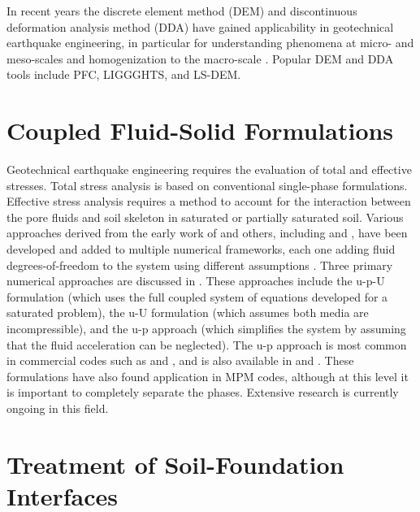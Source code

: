 In recent years the discrete element method (DEM) and discontinuous deformation analysis method (DDA) have gained applicability in geotechnical earthquake engineering, in particular for understanding phenomena at micro- and meso-scales and homogenization to the macro-scale \citep{kawamoto2018}. Popular DEM and DDA tools include PFC, LIGGGHTS, and LS-DEM.   

\section{Coupled Fluid-Solid Formulations}
\label{sec:resp_geotech_2}

Geotechnical earthquake engineering requires the evaluation of total and effective stresses. Total stress analysis is based on conventional single-phase formulations. Effective stress analysis requires a method to account for the interaction between the pore fluids and soil skeleton in saturated or partially saturated soil. Various approaches derived from the early work of \cite{Biot41, Biot56, Biot62} and others, including \cite{Borja06} and \cite{Ehlers02}, have been developed and added to multiple numerical frameworks, each one adding fluid degrees-of-freedom to the system using different assumptions \citep{Arduino01}. Three primary numerical approaches are discussed in \cite{Zienk84}. These approaches include the u-p-U formulation (which uses the full coupled system of equations developed for a saturated problem), the u-U formulation (which assumes both media are incompressible), and the u-p approach (which simplifies the system by assuming that the fluid acceleration can be neglected). The u-p approach is most common in commercial codes such as  and , and is also available in  and . These formulations have also found application in MPM codes, although at this level it is important to completely separate the phases. Extensive research is currently ongoing in this field. 

\section{Treatment of Soil-Foundation Interfaces}
\label{sec:resp_geotech_3}

